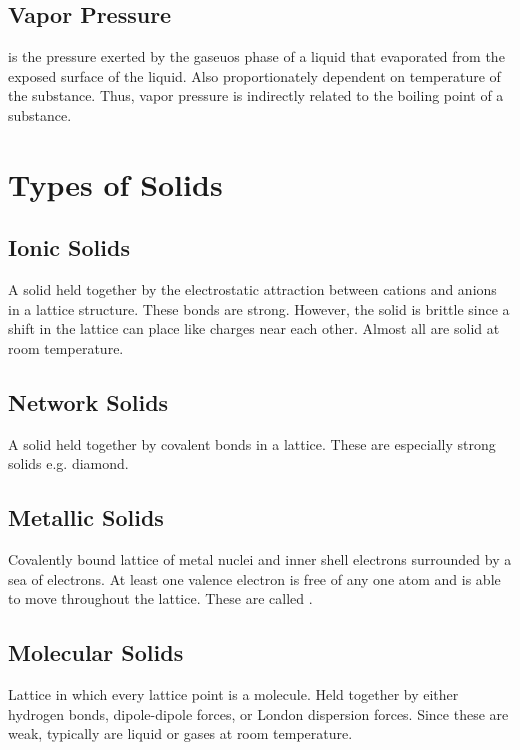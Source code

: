 \documentclass[../GChemReview.tex]{subfiles}
\begin{document}
  \subsection{Vapor Pressure}

   is the pressure exerted by the gaseuos phase of a
  liquid that evaporated from the exposed surface of the liquid. Also
  proportionately dependent on temperature of the substance. Thus, vapor
  pressure is indirectly related to the boiling point of a substance.

  \section{Types of Solids}

  \subsection{Ionic Solids}

  A solid held together by the electrostatic attraction between cations and
  anions in a lattice structure. These bonds are strong. However, the solid is
  brittle since a shift in the lattice can place like charges near each other.
  Almost all are solid at room temperature.

  \subsection{Network Solids}

  A solid held together by covalent bonds in a lattice. These are especially
  strong solids e.g. diamond.

  \subsection{Metallic Solids}

  Covalently bound lattice of metal nuclei and inner shell electrons
  surrounded by a sea of electrons. At least one valence electron is free
  of any one atom and is able to move throughout the lattice. These are
  called .

  \subsection{Molecular Solids}
  Lattice in which every lattice point is a molecule. Held together by either
  hydrogen bonds, dipole-dipole forces, or London dispersion forces. Since these
  are weak, typically are liquid or gases at room temperature.  
\end{document}
